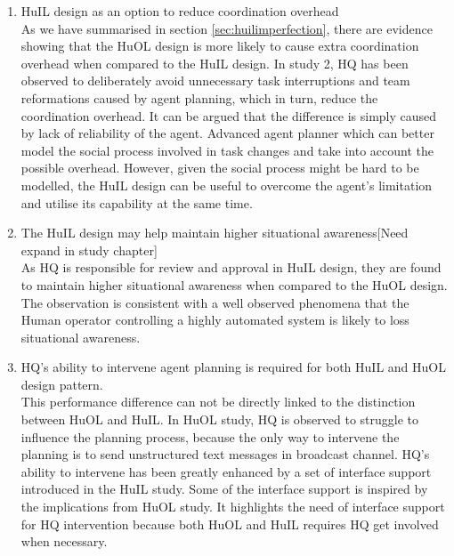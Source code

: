 \begin{enumerate}
\item HuIL design as an option to reduce coordination overhead \\
As we have summarised in section \ref{sec:huilimperfection}, there are evidence showing that the HuOL design is more likely to cause extra coordination overhead when compared to the HuIL design. In study 2, HQ has been observed to deliberately avoid unnecessary task interruptions and team reformations caused by agent planning, which in turn, reduce the coordination overhead. It can be argued that the difference is simply caused by lack of reliability of the agent. Advanced agent planner which can better model the social process involved in task changes and take into account the possible overhead. However, given the social process might be hard to be modelled, the HuIL design can be useful to overcome the agent's limitation and utilise its capability at the same time.\\


\item The HuIL design may help maintain higher situational awareness[Need expand in study chapter]\\
As HQ is responsible for review and approval in HuIL design, they are found to maintain higher situational awareness when compared to the HuOL design. The observation is consistent with a well observed phenomena that the Human operator controlling a highly automated system is likely to loss situational awareness.\\


\item HQ's ability to intervene agent planning is required for both HuIL and HuOL design pattern.\\
This performance difference can not be directly linked to the distinction between HuOL and HuIL. In HuOL study, HQ is observed to struggle to influence the planning process, because the only way to intervene the planning is to send unstructured text messages in broadcast channel. HQ's ability to intervene has been greatly enhanced by a set of interface support introduced in the HuIL study. Some of the interface support is inspired by the implications from HuOL study. It highlights the need of interface support for HQ intervention because both HuOL and HuIL requires HQ get involved when necessary. \\


\end{enumerate}
